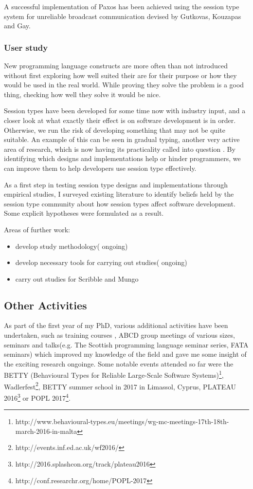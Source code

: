 A successful implementation of Paxos has been achieved  using the session type system for unreliable broadcast communication devised by Gutkovas, Kouzapas and Gay.

\subsubsection{User study}
\label{us}

New programming language constructs are more often than not introduced without first exploring how well suited their are for their purpose or how they would be used in the real world. While proving they solve the problem is a good thing, checking how well they solve it would be nice.

Session types have been developed for some time now with industry input, and a closer look at what exactly their effect is on software development is in order. Otherwise, we run the risk of developing something that may not be quite suitable. An example of this can be seen in gradual typing, another very active area of research, which is now having its practicality called into question \cite{Takikawa:2016:SGT:2837614.2837630}. By identifying which designs and implementations help or hinder programmers, we can improve them to help developers use session type effectively.


As a first step in testing session type designs and implementations through empirical studies, I surveyed existing literature to identify beliefs held by the session type community about how session types affect software development. Some explicit hypotheses were formulated as a result.\cite{Voinea:2016:BST:3001878.3001883}

Areas of further work:
\begin{itemize}
  \item develop study methodology( ongoing)
  \item develop necessary tools for carrying out studies( ongoing)
  \item carry out studies for Scribble and Mungo
\end{itemize}


\subsection{Other Activities}
\label{sec:Activities}

As part of the first year of my PhD, various additional activities have been undertaken, such as training courses
, ABCD group meetings of various sizes, seminars and talks(e.g. The Scottish programming language seminar series, FATA seminars) which improved my knowledge of the field and gave me some insight of the exciting research ongoinge. Some notable events attended so far were the BETTY (Behavioural Types for Reliable Large-Scale Software Systems)\footnote{http://www.behavioural-types.eu/meetings/wg-mc-meetings-17th-18th-march-2016-in-malta}, Wadlerfest\footnote{http://events.inf.ed.ac.uk/wf2016/}, BETTY summer school in 2017 in Limassol, Cyprus, PLATEAU 2016\footnote{http://2016.splashcon.org/track/plateau2016} or POPL 2017\footnote{http://conf.researchr.org/home/POPL-2017}.


